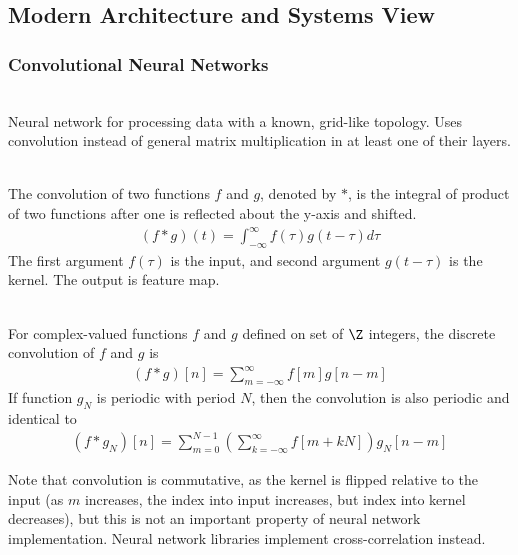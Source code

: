 \subsection{Modern Architecture and Systems View}

\subsubsection{Convolutional Neural Networks}

\begin{definition} \\
Neural network for processing data with a known, grid-like topology. Uses convolution instead of general matrix multiplication in at least one of their layers.
\end{definition}

\begin{definition} \\
The convolution of two functions $f$ and $g$, denoted by $\ast$, is the integral of product of two functions after one is reflected about the y-axis and shifted.
\begin{align*}
(f \ast g)(t) = \int_{-\infty}^{\infty} f(\tau)g(t - \tau) d \tau \nonumber
\end{align*} 
The first argument $f(\tau)$ is the input, and second argument $g(t - \tau)$ is the kernel. The output is feature map.
\end{definition}

\begin{definition} \\
For complex-valued functions $f$ and $g$ defined on set of $\Z$ integers, the discrete convolution of $f$ and $g$ is
\begin{align*}
(f \ast g)[n] = \sum\limits_{m=-\infty}^{\infty} f[m] g[n-m] \nonumber
\end{align*}
If function $g_N$ is periodic with period $N$, then the convolution is also periodic and identical to
\begin{align*}
(f \ast g_N)[n] = \sum\limits_{m=0}^{N-1} \left( \sum\limits_{k=-\infty}^{\infty} f[m+kN] \right) g_N [n-m] \nonumber
\end{align*}
\end{definition}

Note that convolution is commutative, as the kernel is flipped relative to the input (as $m$ increases, the index into input increases, but index into kernel decreases), but this is not an important property of neural network implementation. Neural network libraries implement cross-correlation instead.


